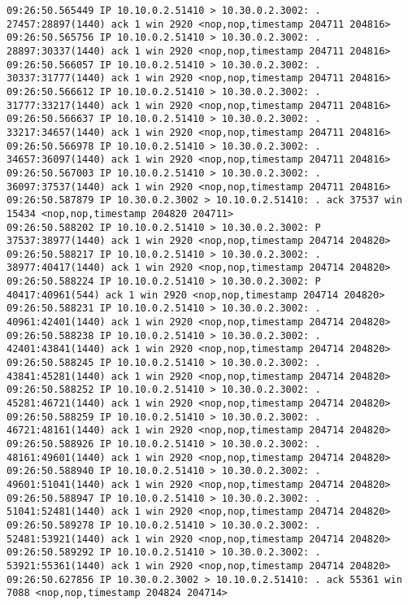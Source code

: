 \documentclass[a4paper,12pt]{article}
\begin{document}
\begin{Verbatim}
09:26:50.565449 IP 10.10.0.2.51410 > 10.30.0.2.3002: . 27457:28897(1440) ack 1 win 2920 <nop,nop,timestamp 204711 204816>
09:26:50.565756 IP 10.10.0.2.51410 > 10.30.0.2.3002: . 28897:30337(1440) ack 1 win 2920 <nop,nop,timestamp 204711 204816>
09:26:50.566057 IP 10.10.0.2.51410 > 10.30.0.2.3002: . 30337:31777(1440) ack 1 win 2920 <nop,nop,timestamp 204711 204816>
09:26:50.566612 IP 10.10.0.2.51410 > 10.30.0.2.3002: . 31777:33217(1440) ack 1 win 2920 <nop,nop,timestamp 204711 204816>
09:26:50.566637 IP 10.10.0.2.51410 > 10.30.0.2.3002: . 33217:34657(1440) ack 1 win 2920 <nop,nop,timestamp 204711 204816>
09:26:50.566978 IP 10.10.0.2.51410 > 10.30.0.2.3002: . 34657:36097(1440) ack 1 win 2920 <nop,nop,timestamp 204711 204816>
09:26:50.567003 IP 10.10.0.2.51410 > 10.30.0.2.3002: . 36097:37537(1440) ack 1 win 2920 <nop,nop,timestamp 204711 204816>
09:26:50.587879 IP 10.30.0.2.3002 > 10.10.0.2.51410: . ack 37537 win 15434 <nop,nop,timestamp 204820 204711>
09:26:50.588202 IP 10.10.0.2.51410 > 10.30.0.2.3002: P 37537:38977(1440) ack 1 win 2920 <nop,nop,timestamp 204714 204820>
09:26:50.588217 IP 10.10.0.2.51410 > 10.30.0.2.3002: . 38977:40417(1440) ack 1 win 2920 <nop,nop,timestamp 204714 204820>
09:26:50.588224 IP 10.10.0.2.51410 > 10.30.0.2.3002: P 40417:40961(544) ack 1 win 2920 <nop,nop,timestamp 204714 204820>
09:26:50.588231 IP 10.10.0.2.51410 > 10.30.0.2.3002: . 40961:42401(1440) ack 1 win 2920 <nop,nop,timestamp 204714 204820>
09:26:50.588238 IP 10.10.0.2.51410 > 10.30.0.2.3002: . 42401:43841(1440) ack 1 win 2920 <nop,nop,timestamp 204714 204820>
09:26:50.588245 IP 10.10.0.2.51410 > 10.30.0.2.3002: . 43841:45281(1440) ack 1 win 2920 <nop,nop,timestamp 204714 204820>
09:26:50.588252 IP 10.10.0.2.51410 > 10.30.0.2.3002: . 45281:46721(1440) ack 1 win 2920 <nop,nop,timestamp 204714 204820>
09:26:50.588259 IP 10.10.0.2.51410 > 10.30.0.2.3002: . 46721:48161(1440) ack 1 win 2920 <nop,nop,timestamp 204714 204820>
09:26:50.588926 IP 10.10.0.2.51410 > 10.30.0.2.3002: . 48161:49601(1440) ack 1 win 2920 <nop,nop,timestamp 204714 204820>
09:26:50.588940 IP 10.10.0.2.51410 > 10.30.0.2.3002: . 49601:51041(1440) ack 1 win 2920 <nop,nop,timestamp 204714 204820>
09:26:50.588947 IP 10.10.0.2.51410 > 10.30.0.2.3002: . 51041:52481(1440) ack 1 win 2920 <nop,nop,timestamp 204714 204820>
09:26:50.589278 IP 10.10.0.2.51410 > 10.30.0.2.3002: . 52481:53921(1440) ack 1 win 2920 <nop,nop,timestamp 204714 204820>
09:26:50.589292 IP 10.10.0.2.51410 > 10.30.0.2.3002: . 53921:55361(1440) ack 1 win 2920 <nop,nop,timestamp 204714 204820>
09:26:50.627856 IP 10.30.0.2.3002 > 10.10.0.2.51410: . ack 55361 win 7088 <nop,nop,timestamp 204824 204714>

\end{Verbatim}
\end{document}
